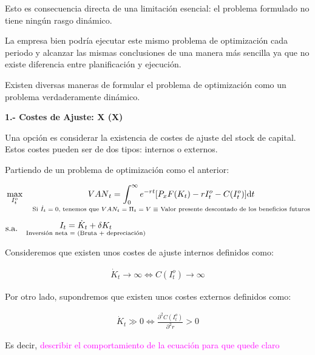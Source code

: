 \documentclass[10pt,a4paper]{article}
\begin{document}
Esto es consecuencia directa de una limitación esencial: el problema formulado no tiene ningún rasgo dinámico. 

La empresa bien podría ejecutar este mismo problema de optimización cada periodo y alcanzar las mismas conclusiones de una manera más sencilla ya que no existe diferencia entre planificación y ejecución. 

Existen diversas maneras de formular el problema de optimización como un problema verdaderamente dinámico. 

\textbf{1.- Costes de Ajuste: X (X)}

Una opción es considerar la existencia de costes de ajuste del stock de capital. Estos costes pueden ser de dos tipos: internos o externos. 

Partiendo de un problema de optimización como el anterior: 

$$\begin{aligned}
  &\max_{I_t^o}\quad \underset{\text{\scriptsize Si $\dot I_t=0$, tenemos que ${VAN_t}=\Pi_t=V\equiv$ Valor presente descontado de los beneficios futuros}}{{VAN}_t=\int_0^\infty e^{-rt}[P_xF(K_t)-rI_t^o-C(I_t^o)]\mathrm dt}\\[0.5em]
  &\text{s.a.}\quad
  \begin{aligned}
    \underset{\text{\scriptsize Inversión neta = (Bruta + depreciación)}}{I_t=\dot K_t+\delta K_t}
  \end{aligned}
\end{aligned}$$

Consideremos que existen unos costes de ajuste internos definidos como:

$$\begin{aligned}
  \dot K_t\to\infty\iff C(I_t^o)\to\infty
\end{aligned}$$

Por otro lado, supondremos que existen unos costes externos definidos como:

$$\begin{aligned}
  \dot K_t\gg0\iff{\frac{\partial^2C(I_t^o)}{\partial^2r}>0}
\end{aligned}$$

Es decir, \textcolor{magenta}{describir el comportamiento de la ecuación para que quede claro}
\end{document}

